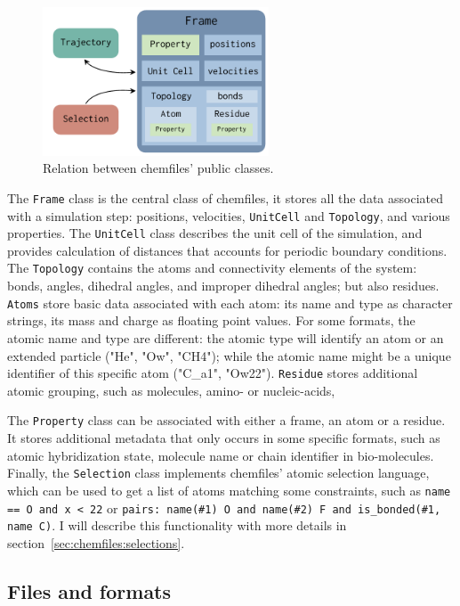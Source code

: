 \documentclass[thesis]{subfiles}
\begin{document}
\begin{figure}[ht]
    \centering
    \includegraphics[width=0.6\textwidth]{figures/images/chemfiles-classes}
    \caption{Relation between chemfiles' public classes.}
    \label{fig:chemfiles:classes}
\end{figure}

The \texttt{Frame} class is the central class of chemfiles, it stores all the
data associated with a simulation step: positions, velocities, \texttt{UnitCell}
and \texttt{Topology}, and various properties. The \texttt{UnitCell} class
describes the unit cell of the simulation, and provides calculation of distances
that accounts for periodic boundary conditions. The \texttt{Topology} contains
the atoms and connectivity elements of the system: bonds, angles, dihedral
angles, and improper dihedral angles; but also residues. \texttt{Atoms} store
basic data associated with each atom: its name and type as character strings,
its mass and charge as floating point values. For some formats, the atomic name
and type are different: the atomic type will identify an atom or an extended
particle ("He", "Ow", "CH4"); while the atomic name might be a unique
identifier of this specific atom ("C\_a1", "Ow22"). \texttt{Residue} stores
additional atomic grouping, such as molecules, amino- or nucleic-acids, \etc

The \texttt{Property} class can be associated with either a frame, an atom or a
residue. It stores additional metadata that only occurs in some specific
formats, such as atomic hybridization state, molecule name or chain identifier
in bio-molecules. Finally, the \texttt{Selection} class implements chemfiles'
atomic selection language, which can be used to get a list of atoms matching
some constraints, such as \texttt{name == O and x < 22} or \texttt{pairs:
name(\#1) O and name(\#2) F and is\_bonded(\#1, name C)}. I will describe this
functionality with more details in section~\ref{sec:chemfiles:selections}.

\subsection{Files and formats}
\label{sec:chemfiles:formats}
\end{document}

